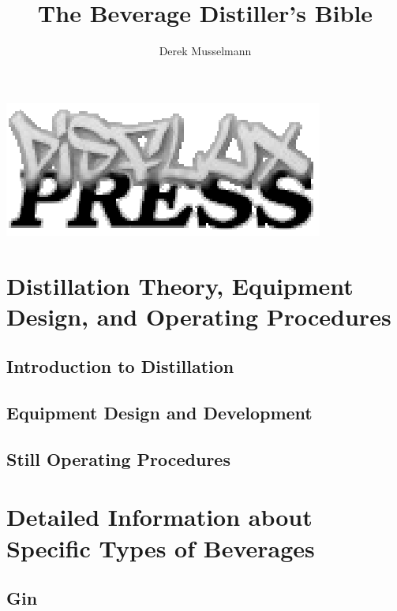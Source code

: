 \documentclass[10pt,ebook,extrafontsizes]{memoir}
\title{The Beverage Distiller's Bible}
\author{Derek Musselmann}
\begin{document}
\maketitle
\includegraphics[scale=0.55]{disfluxpress.eps}
\clearpage
\tableofcontents

\part{Distillation Theory, Equipment Design, and Operating Procedures}
\chapter{Introduction to Distillation}

\chapter{Equipment Design and Development}

\chapter{Still Operating Procedures}


\part{Detailed Information about Specific Types of Beverages}
\chapter{Gin}



\clearpage
\printbibliography
\end{document}
